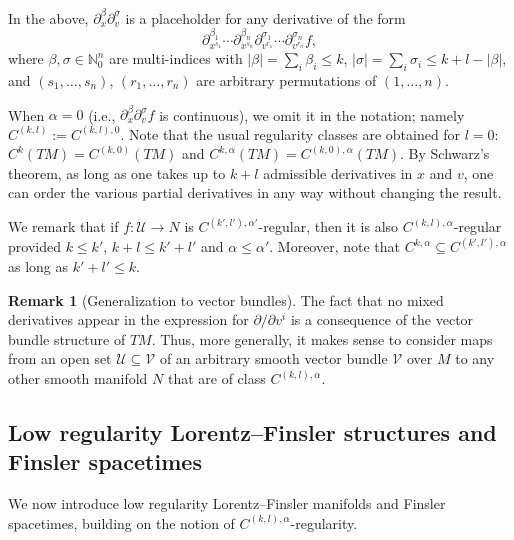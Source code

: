 \documentclass[a4paper,11pt]{article}
\numberwithin{equation}{section}
\theoremstyle{definition}
\newtheorem{Remark}[Definition]{Remark}
\theoremstyle{plain}
\newcommand{\N}{\mathbb N}
\begin{document}
In the above, $\partial_x^\beta \partial_v^\sigma$ is a placeholder for any derivative of the form 
\begin{equation*}
    \partial_{x^{s_1}}^{\beta_1}\cdots \partial _{x^{s_n}}^{\beta_n} \partial_{v^{r_1}}^{\sigma_1}\cdots \partial_{v^{r_n}}^{\sigma_n} f, 
\end{equation*}
where $\beta,\sigma \in \N_0^n$ are multi-indices with $|\beta| = \sum_i \beta_i \leq k$, $|\sigma| = \sum_i \sigma_i \leq k+l-|\beta|$, and $(s_1,\ldots,s_n)$, $(r_1,\ldots,r_n)$ are arbitrary permutations of $(1,\ldots,n)$.

When $\alpha = 0$ (i.e., $\partial_x^\beta \partial_v^\sigma f$ is continuous), we omit it in the notation; namely $C^{(k,l)}:=C^{(k,l),0}$. 
Note that the usual regularity classes are obtained for $l = 0$: $C^k(TM) = C^{(k,0)}(TM)$ and $C^{k,\alpha}(TM) = C^{(k,0),\alpha}(TM)$.
By Schwarz's theorem, as long as one takes up to $k+l$ admissible derivatives in $x$ and $v$, one can order the various partial derivatives in any way without changing the result.

We remark that if $f:\mathcal{U} \to N$ is $C^{(k',l'),\alpha'}$-regular, then it is also $C^{(k,l),\alpha}$-regular provided $k \leq k'$, $k+l \leq k'+l'$ and $\alpha \leq \alpha'$. 
Moreover, note that $C^{k,\alpha} \subseteq C^{(k',l'),\alpha}$ as long as $k' + l' \leq k$.

\begin{Remark}[Generalization to vector bundles]
The fact that no mixed derivatives appear in the expression for $\partial / \partial v^i$ is a consequence of the vector bundle structure of $TM$.
Thus, more generally, it makes sense to consider maps from an open set $\mathcal{U} \subseteq \mathcal{V}$ of an arbitrary smooth vector bundle $\mathcal{V}$ over $M$ to any other smooth manifold $N$ that are of class $C^{(k,l),\alpha}$.
\end{Remark}

\subsection{Low regularity Lorentz--Finsler structures and Finsler spacetimes}

We now introduce low regularity Lorentz--Finsler manifolds and Finsler spacetimes, building on the notion of $C^{(k,l),\alpha}$-regularity.
\end{document}
